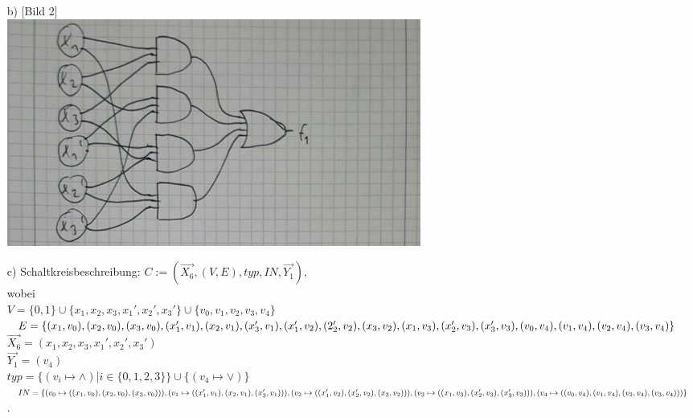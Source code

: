 \documentclass{scrartcl}
\begin{document}
\begin{itemize}
		\item[b)]
		[Bild 2]\\
		\includegraphics[width=13.6cm]{bild2.jpg}
		\item[c)] Schaltkreisbeschreibung:
		$ C := (\overrightarrow{X_{6}}, (V,E), typ, IN, \overrightarrow{Y_{1}}), $\\
		wobei\\
		$ V = \{0,1\} \cup \{x_{1}, x_{2}, x_{3}, x_{1}', x_{2}', x_{3}'\} \cup \{v_{0}, v_{1}, v_{2}, v_{3}, v_{4}\} $\\
		$ E = \{(x_{1},v_{0}), (x_{2},v_{0}), (x_{3},v_{0}), 
		(x_{1}',v_{1}), (x_{2},v_{1}), (x_{3}',v_{1}), 
		(x_{1}',v_{2}), (2_{2}',v_{2}), (x_{3},v_{2}), 
		(x_{1},v_{3}), (x_{2}',v_{3}),\\ (x_{3}',v_{3}), 
		(v_{0},v_{4}), (v_{1},v_{4}), (v_{2},v_{4}), (v_{3},v_{4})\} $ \\
		$ \overrightarrow{X_{6}} = (x_{1}, x_{2}, x_{3}, x_{1}', x_{2}', x_{3}') $ \\
		$ \overrightarrow{Y_{1}} = (v_{4}) $ \\
		$ typ = \{(v_{i} \mapsto \wedge) | i \in \{0,1,2,3\}\} \cup \{(v_{4} \mapsto \vee)\}$ \\
		$ IN = \{(v_{0} \mapsto ((x_{1}, v_{0}),(x_{2}, v_{0}),(x_{3}, v_{0}))), (v_{1} \mapsto ((x_{1}', v_{1}), (x_{2}, v_{1}), (x_{3}', v_{1}))), \\(v_{2} \mapsto ((x_{1}', v_{2}),(x_{2}', v_{2}),(x_{3}, v_{2}))), (v_{3} \mapsto ((x_{1}, v_{3}),(x_{2}', v_{3}),(x_{3}', v_{3}))), \\(v_{4} \mapsto ((v_{0}, v_{4}),(v_{1}, v_{4}),(v_{2}, v_{4}),(v_{3}, v_{4})))\} $.
		
	\end{itemize}
\end{document}
